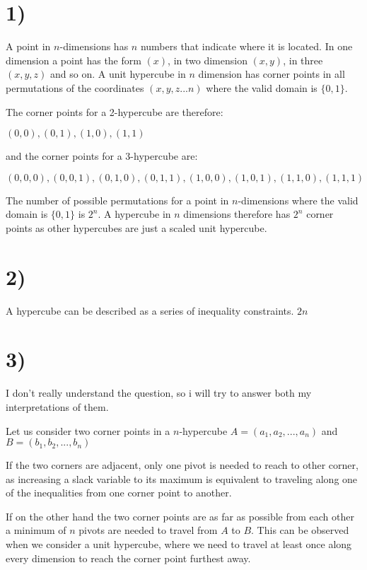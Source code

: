 \section*{1)}

A point in $n$-dimensions has $n$ numbers that indicate where it is located. In one dimension a point has the form $(x)$, in two dimension $(x, y)$, in three $(x, y, z)$ and so on. A unit hypercube in $n$ dimension has corner points in all permutations of the coordinates $(x, y, z...n)$ where the valid domain is $\{0, 1\}$. 

The corner points for a 2-hypercube are therefore:
\begin{center}
$(0,0), (0,1), (1,0), (1,1)$
\end{center}
and the corner points for a 3-hypercube are:
\begin{center}
$(0,0,0), (0,0,1), (0,1,0), (0,1,1), (1,0,0), (1,0,1), (1,1,0), (1,1,1)$
\end{center}
The number of possible permutations for a point in $n$-dimensions where the valid domain is $\{0, 1\}$ is $2^n$. A hypercube in $n$ dimensions therefore has $2^n$ corner points as other hypercubes are just a scaled unit hypercube. 

\section*{2)}
A hypercube can be described as a series of inequality constraints.   $2n$

\section*{3)}
I don't really understand the question, so i will try to answer both my interpretations of them.

Let us consider two corner points in a $n$-hypercube $A=(a_1, a_2, ..., a_n)$ and $B=(b_1, b_2, ..., b_n)$

If the two corners are adjacent, only one pivot is needed to reach to other corner, as increasing a slack variable to its maximum is equivalent to traveling along one of the inequalities from one corner point to another.

If on the other hand the two corner points are as far as possible from each other a minimum of $n$ pivots are needed to travel from $A$ to $B$. This can be observed when we consider a unit hypercube, where we need to travel at least once along every dimension to reach the corner point furthest away.

